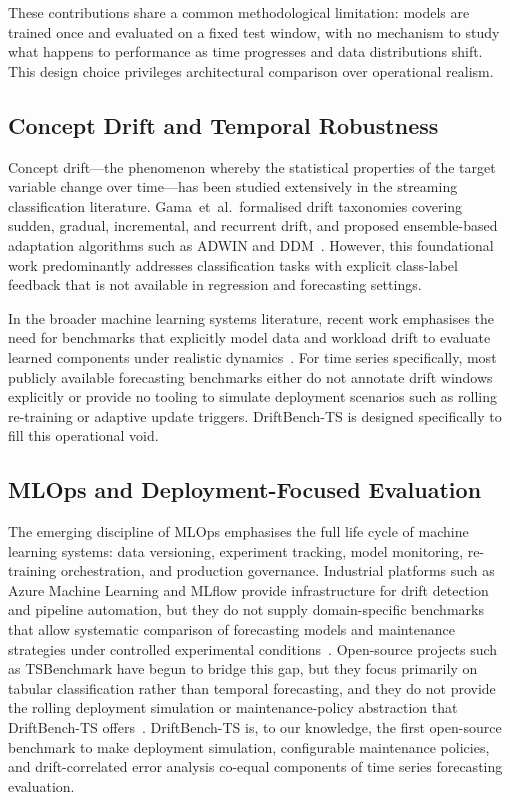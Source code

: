 \documentclass[conference]{IEEEtran}
\begin{document}
These contributions share a common methodological limitation: models
are trained once and evaluated on a fixed test window, with no
mechanism to study what happens to performance as time progresses and
data distributions shift. This design choice privileges architectural
comparison over operational realism.

\subsection{Concept Drift and Temporal Robustness}

Concept drift---the phenomenon whereby the statistical properties of
the target variable change over time---has been studied extensively
in the streaming classification literature. Gama~et~al.\ formalised
drift taxonomies covering sudden, gradual, incremental, and recurrent
drift, and proposed ensemble-based adaptation algorithms such as
ADWIN and DDM~\cite{gama2014survey}. However, this foundational work
predominantly addresses classification tasks with explicit class-label
feedback that is not available in regression and forecasting settings.

In the broader machine learning systems literature, recent work
emphasises the need for benchmarks that explicitly model data and
workload drift to evaluate learned components under realistic
dynamics~\cite{mlops_drift}. For time series specifically, most
publicly available forecasting benchmarks either do not annotate drift
windows explicitly or provide no tooling to simulate deployment
scenarios such as rolling re-training or adaptive update triggers.
DriftBench-TS is designed specifically to fill this operational void.

\subsection{MLOps and Deployment-Focused Evaluation}

The emerging discipline of MLOps emphasises the full life cycle of
machine learning systems: data versioning, experiment tracking,
model monitoring, re-training orchestration, and production
governance. Industrial platforms such as Azure Machine Learning and
MLflow provide infrastructure for drift detection and pipeline
automation, but they do not supply domain-specific benchmarks that
allow systematic comparison of forecasting models and maintenance
strategies under controlled experimental
conditions~\cite{mlops_drift}. Open-source projects such as
TSBenchmark have begun to bridge this gap, but they focus primarily
on tabular classification rather than temporal forecasting, and they
do not provide the rolling deployment simulation or
maintenance-policy abstraction that DriftBench-TS
offers~\cite{tsbenchmark}. DriftBench-TS is, to our knowledge, the
first open-source benchmark to make deployment simulation,
configurable maintenance policies, and drift-correlated error
analysis co-equal components of time series forecasting evaluation.
\end{document}

